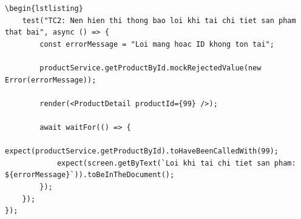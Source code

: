 \documentclass[a4paper,12pt]{article}
\begin{document}
\begin{tcolorbox}[breakable, colback=green!5,colframe=black!50,title=Product Detail Integration Tests]
\begin{lstlisting}
\begin{lstlisting}
    test("TC2: Nen hien thi thong bao loi khi tai chi tiet san pham that bai", async () => {
        const errorMessage = "Loi mang hoac ID khong ton tai";

        productService.getProductById.mockRejectedValue(new Error(errorMessage));

        render(<ProductDetail productId={99} />);

        await waitFor(() => {
            expect(productService.getProductById).toHaveBeenCalledWith(99);
            expect(screen.getByText(`Loi khi tai chi tiet san pham: ${errorMessage}`)).toBeInTheDocument();
        });
    });
});

\end{lstlisting}
\end{tcolorbox}
\end{document}
